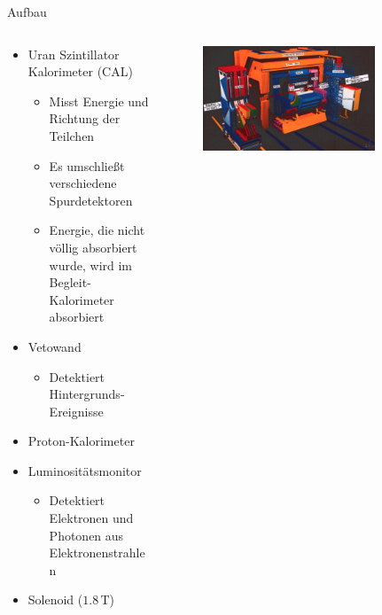 \documentclass[aspectratio=1610, 9pt]{beamer}
\begin{document}
\begin{frame}{Aufbau}
  \begin{columns}
    \begin{column}{0.4\textwidth}
      \begin{itemize}
        \item {Uran Szintillator Kalorimeter (CAL)}
        \begin{itemize}
          \item {Misst Energie und Richtung der Teilchen}
          \item {Es umschließt verschiedene  Spurdetektoren}
          \item{Energie, die nicht völlig absorbiert wurde, wird im Begleit-Kalorimeter absorbiert}
        \end{itemize}
          \item{Vetowand}
          \begin{itemize}
            \item {Detektiert Hintergrunds-Ereignisse}
          \end{itemize}
          \item {Proton-Kalorimeter}
          \item {Luminositätsmonitor}
          \begin{itemize}
            \item {Detektiert Elektronen und Photonen aus Elektronenstrahlen}
          \end{itemize}
          \item{Solenoid ($1.8 \,\mathrm{T} $)}
      \end{itemize}
    \end{column}

    \begin{column}{0.6\textwidth}
      \begin{figure}
        \centering
        \includegraphics[width=0.8\textwidth]{images/Zeus.png}
      \end{figure}
    \end{column}
  \end{columns}
\end{frame}
\end{document}
